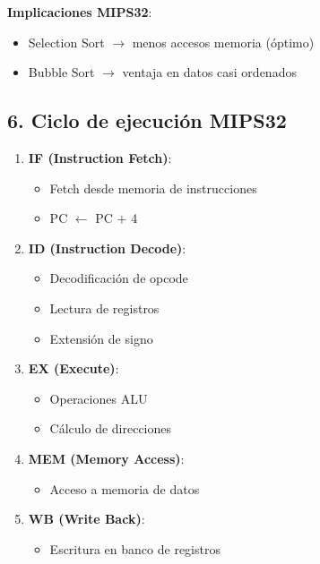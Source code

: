 \documentclass{article}
\begin{document}
\textbf{Implicaciones MIPS32}:
\begin{itemize}
  \item Selection Sort $\rightarrow$ menos accesos memoria (óptimo)
  \item Bubble Sort $\rightarrow$ ventaja en datos casi ordenados
\end{itemize}

\subsection*{6. Ciclo de ejecución MIPS32}
\begin{enumerate}
  \item \textbf{IF (Instruction Fetch)}: 
  \begin{itemize}
    \item Fetch desde memoria de instrucciones
    \item PC $\leftarrow$ PC + 4
  \end{itemize}
  
  \item \textbf{ID (Instruction Decode)}: 
  \begin{itemize}
    \item Decodificación de opcode
    \item Lectura de registros
    \item Extensión de signo
  \end{itemize}
  
  \item \textbf{EX (Execute)}: 
  \begin{itemize}
    \item Operaciones ALU
    \item Cálculo de direcciones
  \end{itemize}
  
  \item \textbf{MEM (Memory Access)}: 
  \begin{itemize}
    \item Acceso a memoria de datos
  \end{itemize}
  
  \item \textbf{WB (Write Back)}: 
  \begin{itemize}
    \item Escritura en banco de registros
  \end{itemize}
\end{enumerate}
\end{document}
